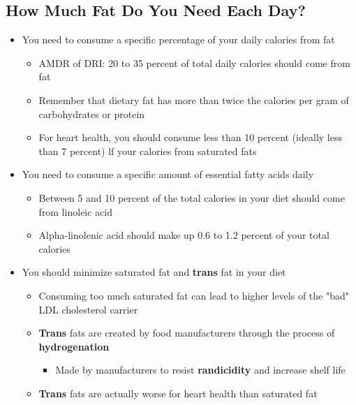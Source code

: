 \documentclass[12pt]{article}
\begin{document}
        \subsection{How Much Fat Do You Need Each Day?}
            \begin{itemize}
                \item You need to consume a specific percentage of your daily calories from fat
                    \begin{itemize}
                        \item AMDR of DRI: 20 to 35 percent of total daily calories should come from fat
                        \item Remember that dietary fat has more than twice the calories per gram of carbohydrates or protein
                        \item For heart health, you should consume less than 10 percent (ideally less than 7 percent) lf your calories from saturated fats
                    \end{itemize}
                \item You need to consume a specific amount of essential fatty acids daily
                    \begin{itemize}
                        \item Between 5 and 10 percent of the total calories in your diet should come from linoleic acid
                        \item Alpha-linolenic acid should make up 0.6 to 1.2 percent of your total calories
                    \end{itemize}
                \item You should minimize saturated fat and \textbf{trans} fat in your diet
                    \begin{itemize}
                        \item Consuming too much saturated fat can lead to higher levels of the "bad" LDL cholesterol carrier
                        \item \textbf{Trans} fats are created by food manufacturers through the process of \textbf{hydrogenation}
                            \begin{itemize}
                                \item Made by manufacturers to resist \textbf{randicidity} and increase shelf life
                            \end{itemize}
                        \item \textbf{Trans} fats are actually worse for heart health than saturated fat

\end{itemize}
\end{itemize}
\end{document}
